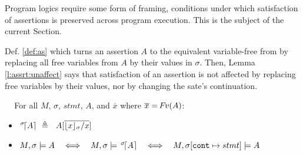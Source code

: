 Program logics require some form of framing, \ie conditions under which  satisfaction of  assertions is preserved across program execution. 
This is the subject of the current Section.

Def. \ref{def:as} which turns an assertion  $A$ %
to the equivalent variable-free from by replacing all free variables from $A$ by their values in $\sigma$. %
 Then,   Lemma \ref{l:assrt:unaffect}  says  that 
satisfaction of an assertion is not affected by replacing free  variables by their values, nor by changing the sate's continuation.

\begin{definitionAndLemma} $ $ ~
\label{def:as}
\label{lemma:addr:expr}
\label{l:assrt:unaffect}
For all $M$, $\sigma$,  $stmt$,   $A$, and $\overline x$ where  $\overline x = {\hspace{-1pt}F\hspace{-1pt}}v{(A)}$:

\begin{itemize} %
\item

${\as  \sigma A} \ \triangleq \ \ A[\overline {{\interpret {\sigma} {x}}/x}]$\  
\item
$\satisfiesA{M}{\sigma}{A}   \ \ \ \Longleftrightarrow\ \ \ \satisfiesA{M}{\sigma}{{\as {\sigma} A} }    \ \ \ \Longleftrightarrow\ \ \  \satisfiesA{M}{\sigma[\prg{cont}\mapsto stmt]}{A}$ 
\end{itemize}
\end{definitionAndLemma}

%
%
%

